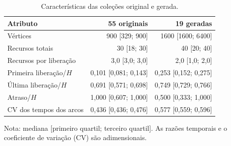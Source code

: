 \begin{table}[!htbp]
\centering
\caption{Características das coleções original e gerada.}
\label{tab:res-perfil}
\begin{singlespace}
\normalsize
\setlength{\tabcolsep}{5pt}
\renewcommand{\arraystretch}{1.15}
\begin{tabular}{lrr}
\hline\hline
\textbf{Atributo} & \textbf{55 originais} & \textbf{19 geradas} \\
\hline
Vértices & 900 [329; 900] & 1600 [1600; 6400] \\
Recursos totais & 30 [18; 30] & 40 [20; 40] \\
Recursos por liberação & 3,0 [3,0; 3,0] & 2,0 [1,0; 2,0] \\
Primeira liberação/$H$ & 0,101 [0,081; 0,143] & 0,253 [0,152; 0,275] \\
Última liberação/$H$ & 0,691 [0,571; 0,698] & 0,749 [0,729; 0,766] \\
Atraso/$H$ & 1,000 [0,607; 1,000] & 0,500 [0,333; 1,000] \\
CV dos tempos dos arcos & 0,436 [0,436; 0,476] & 0,577 [0,559; 0,596] \\
\hline\hline
\end{tabular}
\par\smallskip
{\small Nota: mediana [primeiro quartil; terceiro quartil]. As razões temporais e o coeficiente de variação (CV) são adimensionais.\par}
{}
\end{singlespace}
\end{table}
